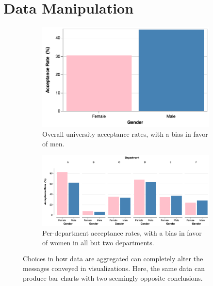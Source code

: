 \documentclass{vgtc}                          %
\begin{document}
\section{Data Manipulation}

\begin{figure}
	\centering
	\begin{subfigure}{0.85\columnwidth}
		\centering
		\includegraphics[width=.45\columnwidth]{pictures/simpson.png}
		\caption{Overall university acceptance rates, with a bias in favor of men.}
	\end{subfigure}
	
	\begin{subfigure}{0.85\columnwidth}
		\includegraphics[width=\textwidth]{pictures/simpson2.png}
		\caption{Per-department acceptance rates, with a bias in favor of women in all but two departments.}
	\end{subfigure}
	\caption{Choices in how data are aggregated can completely alter the messages conveyed in visualizations. Here, the same data can produce bar charts with two seemingly opposite conclusions.}
	\label{fig:simpsons}
\end{figure}
\end{document}
